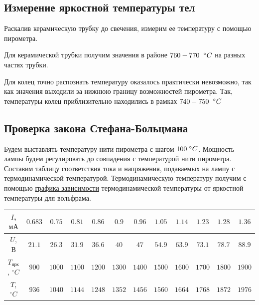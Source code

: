 \documentclass[12pt]{article}
\begin{document}
    \subsection{Измерение яркостной температуры тел}

      Раскалив керамическую трубку до свечения, измерим ее температуру с
      помощью пирометра.

      Для керамической трубки получим значения в районе
      $760 - 770 \hspace{0.2cm} ^{\circ}C$ на разных частях трубки.

      Для колец точно распознать температуру оказалось практически невозможно,
      так как значения выходили за нижнюю границу возможностей пирометра. Так,
      температуры колец приблизительно находились в рамках
      $740 - 750 \hspace{0.2cm} ^{\circ}C$

    \subsection{Проверка закона Стефана-Больцмана}

      Будем выставлять температуру нити пирометра с шагом
      $100 \hspace{0.1cm} ^{\circ}C$. Мощность лампы будем регулировать до
      совпадения с температурой нити пирометра. Составим таблицу соответствия
      тока и напряжения, подаваемых на лампу с термодинамической температурой.
      Термодинамическую температуру получим с помощью
      \hyperref[fig:volfram]{графика зависимости} термодинамической температуры
      от яркостной температуры для вольфрама.\\

      \begin{tabular}{ || c || c | c | c | c | c | c | c | c | c | c | c || }
        \hline
        $I$, $мА$ & $0.683$ & $0.75$ & $0.81$ & $0.86$ & $0.9$ & $0.96$ & $1.05$ & $1.14$ & $1.23$ & $1.28$ & $1.36$ \\ \hline
        $U$, $В$ & $21.1$ & $26.3$ & $31.9$ & $36.6$ & $40$ & $47$ & $54.9$ & $63.9$ & $73.1$ & $78.7$ & $88.9$ \\ \hline
        $T_{ярк}$, $^{\circ}C$ & $900$ & $1000$ & $1100$ & $1200$ & $1300$ & $1400$ & $1500$ & $1600$ & $1700$ & $1800$ & $1900$ \\ \hline
        $T$, $^{\circ}C$ & $936$ & $1040$ & $1144$ & $1248$ & $1352$ & $1456$ & $1560$ & $1664$ & $1768$ & $1872$ & $1976$ \\
        \hline
      \end{tabular}\\
\end{document}
